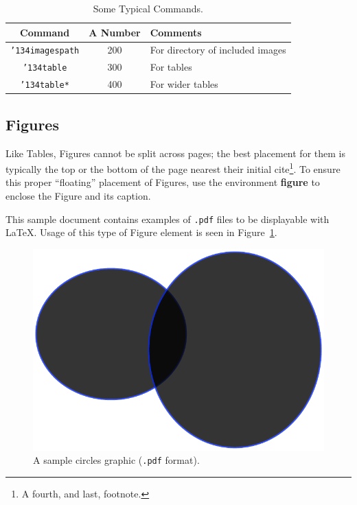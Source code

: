 \documentclass[article,english]{stucosrec}
\newcommand{\latex}{\LaTeX\xspace}
\begin{document}
	\begin{table}
		\centering
		\caption{Some Typical Commands.}
		\label{tab:table2}
		\begin{tabular}{|c|c|l|} \hline
			Command&A Number&Comments\\ \hline
			\texttt{{\char'134}imagespath} & 200 & For directory of included images \\ \hline
			\texttt{{\char'134}table} & 300 & For tables\\ \hline
			\texttt{{\char'134}table*} & 400& For wider tables\\ \hline
		\end{tabular}
	\end{table}
	
	\subsection{Figures}
	
	Like Tables, Figures cannot be split across pages; the best placement for them is typically the top or the bottom of the page nearest their initial cite\footnote{A fourth, and last, footnote.}.
	To ensure this proper ``floating'' placement of Figures, use the environment \textbf{figure} to enclose the Figure and its caption.
	
	This sample document contains examples of \texttt{.pdf} files to be displayable with \latex.
	Usage of this type of Figure element is seen in Figure~\ref{fig:circles}.
	
	\begin{figure}
		\centering
		\includegraphics[scale=0.5]{circles.pdf}
		\caption{A sample circles graphic (\texttt{.pdf} format).}
		\label{fig:circles}
	\end{figure}
\end{document}
